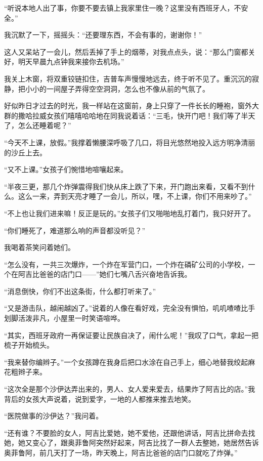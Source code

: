 \par “听说本地人出了事，你要不要去镇上我家里住一晚？这里没有西班牙人，不安全。”
\par 我沉默了一下，摇摇头：“还要理东西，不会有事的，谢谢你！”
\par 这人又呆站了一会儿，然后丢掉了手上的烟蒂，对我点点头，说：“那么门窗都关好，明天早晨九点钟我来接你去机场。”
\par 我关上木窗，将双重铰链扣住，吉普车声慢慢地远去，终于听不见了。重沉沉的寂静，把小小的一间屋子弄得空空洞洞，怎么也不像从前的气氛了。
\par 好似昨日才过去的时光，我一样站在这窗前，身上只穿了一件长长的睡袍，窗外大群的撒哈拉威女孩们嘻嘻哈哈地在同我说着话：“三毛，快开门吧！我们等了半天了，怎么还睡着呢？”
\par “今天不上课，放假。”我撑着懒腰深呼吸了几口，将目光悠然地投入远方明净清丽的沙丘上去。
\par “又不上课。”女孩子们惋惜地喧嚷起来。
\par “半夜三更，那几个炸弹震得我们快从床上跌了下来，开门跑出来看，又看不到什么。这么一来，弄到天亮才睡了一会儿，所以，嘿，不上课，你们不用来吵了。”
\par “不上也让我们进来嘛！反正是玩的。”女孩子们又啪啪地乱打着门，我只好开了。
\par “你们睡死了，难道那么响的声音都没听见？”
\par 我喝着茶笑问着她们。
\par “怎么没有，一共三次爆炸，一个炸在军营门口，一个炸在磷矿公司的小学校，一个在阿吉比爸爸的店门口——”她们七嘴八舌兴奋地告诉我。
\par “消息倒快，你们不出这条街，什么都打听来了。”
\par “又是游击队，越闹越凶了。”说着的人像在看好戏，完全没有惧怕，叽叽喳喳比手划脚活泼非凡，小屋里一时笑语喧哗。
\par “其实，西班牙政府一再保证要让民族自决了，闹什么呢！”我叹了口气，拿起一把梳子开始梳头。
\par “我来替你编辫子。”一个女孩蹲在我身后把口水涂在自己手上，细心地替我绞起麻花粗辫子来。
\par “这次全是那个沙伊达弄出来的，男人、女人爱来爱去，结果炸了阿吉比的店。”我背后的女孩大声说着，说到爱字，一地的人都推来推去地笑。
\par “医院做事的沙伊达？”我问着。
\par “还有谁？不要脸的女人，阿吉比爱她，她不爱他，还跟他讲话，阿吉比拼命去找她，她又变心了，跟奥菲鲁阿突然好起来，阿吉比找了一群人去整她，她居然告诉奥菲鲁阿，前几天打了一场，昨天晚上，阿吉比爸爸的店门口就吃了炸弹。”
